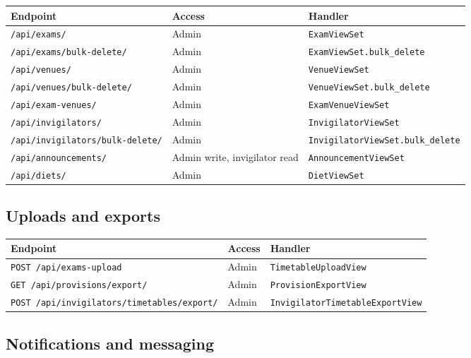 \begin{longtable}{p{}p{}p{}}
\toprule
\textbf{Endpoint} & \textbf{Access} & \textbf{Handler} \\
\midrule
\texttt{/api/exams/} & Admin & \texttt{ExamViewSet} \\
\texttt{/api/exams/bulk-delete/} & Admin & \texttt{ExamViewSet.bulk\_delete} \\
\texttt{/api/venues/} & Admin & \texttt{VenueViewSet} \\
\texttt{/api/venues/bulk-delete/} & Admin & \texttt{VenueViewSet.bulk\_delete} \\
\texttt{/api/exam-venues/} & Admin & \texttt{ExamVenueViewSet} \\
\texttt{/api/invigilators/} & Admin & \texttt{InvigilatorViewSet} \\
\texttt{/api/invigilators/bulk-delete/} & Admin & \texttt{InvigilatorViewSet.bulk\_delete} \\
\texttt{/api/announcements/} & Admin write, invigilator read & \texttt{AnnouncementViewSet} \\
\texttt{/api/diets/} & Admin & \texttt{DietViewSet} \\
\bottomrule
\end{longtable}

\subsection{Uploads and exports}
\label{subsec:api:endpoints:uploads}

\begin{longtable}{p{}p{}p{}}
\toprule
\textbf{Endpoint} & \textbf{Access} & \textbf{Handler} \\
\midrule
\texttt{POST /api/exams-upload} & Admin & \texttt{TimetableUploadView} \\
\texttt{GET /api/provisions/export/} & Admin & \texttt{ProvisionExportView} \\
\texttt{POST /api/invigilators/timetables/export/} & Admin & \texttt{InvigilatorTimetableExportView} \\
\bottomrule
\end{longtable}

\subsection{Notifications and messaging}
\label{subsec:api:endpoints:notifications}

